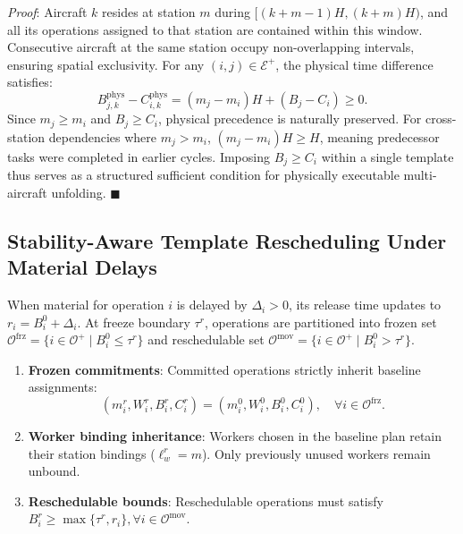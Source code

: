 \documentclass[journal,10pt]{IEEEtran}
\begin{document}
\textit{Proof}: Aircraft $k$ resides at station $m$ during $[(k+m-1)H, (k+m)H)$, and all its operations assigned to that station are contained within this window. Consecutive aircraft at the same station occupy non-overlapping intervals, ensuring spatial exclusivity. For any $(i,j)\in\mathcal{E}^+$, the physical time difference satisfies:
\begin{equation}
B_{j,k}^{\mathrm{phys}} - C_{i,k}^{\mathrm{phys}} = (m_j - m_i)H + (B_j - C_i) \ge 0.
\end{equation}
Since $m_j\ge m_i$ and $B_j\ge C_i$, physical precedence is naturally preserved. For cross-station dependencies where $m_j>m_i$, $(m_j-m_i)H\ge H$, meaning predecessor tasks were completed in earlier cycles. Imposing $B_j\ge C_i$ within a single template thus serves as a structured sufficient condition for physically executable multi-aircraft unfolding. \hfill $\blacksquare$

\subsection{Stability-Aware Template Rescheduling Under Material Delays}

When material for operation $i$ is delayed by $\Delta_i>0$, its release time updates to $r_i=B_i^0+\Delta_i$. At freeze boundary $\tau^r$, operations are partitioned into frozen set $\mathcal{O}^{\mathrm{frz}}=\{i\in\mathcal{O}^+\mid B_i^0\le\tau^r\}$ and reschedulable set $\mathcal{O}^{\mathrm{mov}}=\{i\in\mathcal{O}^+\mid B_i^0>\tau^r\}$.

\begin{enumerate}
\item \textbf{Frozen commitments}: Committed operations strictly inherit baseline assignments:
\begin{equation}
(m_i^r, W_i^r, B_i^r, C_i^r) = (m_i^0, W_i^0, B_i^0, C_i^0), \quad \forall i\in\mathcal{O}^{\mathrm{frz}}.
\end{equation}
\item \textbf{Worker binding inheritance}: Workers chosen in the baseline plan retain their station bindings ($\ell_w^r=m$). Only previously unused workers remain unbound.
\item \textbf{Reschedulable bounds}: Reschedulable operations must satisfy $B_i^r \ge \max\{\tau^r, r_i\}, \forall i\in\mathcal{O}^{\mathrm{mov}}$.
\end{enumerate}
\end{document}
